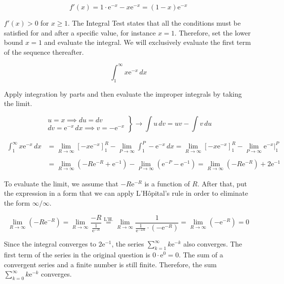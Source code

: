 \documentclass{article}
\begin{document}
\[f'(x)=1\cdot\mathrm{e}^{-x}-x\mathrm{e}^{-x}=(1-x)\mathrm{e}^{-x}\]

\hfill

\noindent $f'(x)>0$ for $x\geq1$. The Integral Test states that all the conditions must be satisfied for and after a specific value, for instance $x=1$. Therefore, set the lower bound $x=1$ and evaluate the integral. We will exclusively evaluate the first term of the sequence thereafter.

\[\int_1^{\infty}x\mathrm{e}^{-x}\,dx\]

\hfill

\noindent Apply integration by parts and then evaluate the improper integrals by taking the limit.

\[\left.\begin{array}{c}
u=x\implies du=dv\\[1em]
dv=\mathrm{e}^{-x}\,dx\implies v=-\mathrm{e}^{-x}
\end{array}\right\}\rightarrow \int u\,dv=uv-\int v\,du\]

\begin{align*}\int_1^{\infty}x\mathrm{e}^{-x}\,dx&=\lim_{R\to\infty}\left[-x\mathrm{e}^{-x}\right]_1^R-\lim_{P\to\infty}\int_1^P-\mathrm{e}^{-x}\,dx=\lim_{R\to\infty}\left[-x\mathrm{e}^{-x}\right]_1^R-\lim_{P\to\infty}\mathrm{e}^{-x}\bigg|_1^P\\\\&=\lim_{R\to\infty}\left(-R\mathrm{e}^{-R}+\mathrm{e}^{-1}\right)-\lim_{P\to\infty}\left(\mathrm{e}^{-P}-\mathrm{e}^{-1}\right)=\lim_{R\to\infty}\left(-R\mathrm{e}^{-R}\right)+2\mathrm{e}^{-1}\end{align*}

\hfill

\noindent To evaluate the limit, we assume that $-R\mathrm{e}^{-R}$ is a function of $R$. After that, put the expression in a form that we can apply L'Hôpital's rule in order to eliminate the form $\infty/\infty$.

\[\lim_{R\to\infty}\left(-R\mathrm{e}^{-R}\right)=\lim_{R\to\infty}\frac{-R}{\frac1{\mathrm{e}^{-R}}}\overset{\text{L'H.}}{=}\lim_{R\to\infty}\frac1{\frac{1}{\mathrm{e}^{-2R}}\cdot\left(-\mathrm{e}^{-R}\right)}=\lim_{R\to\infty}\left(-\mathrm{e}^{-R}\right)=0\]

\hfill

\noindent Since the integral converges to $2\mathrm{e}^{-1}$, the series $\displaystyle\sum_{k=1}^{\infty}k\mathrm{e}^{-k}$ also converges. The first term of the series in the original question is $0\cdot\mathrm{e}^0=0$. The sum of a convergent series and a finite number is still finite. Therefore, the sum $\displaystyle\sum_{k=0}^{\infty}k\mathrm{e}^{-k}$ converges.
\end{document}
